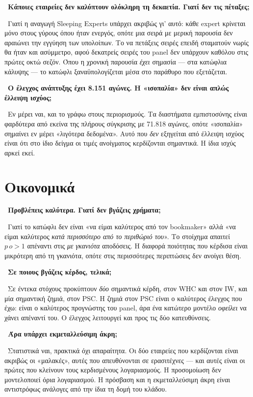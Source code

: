 \documentclass[11pt,a4paper]{article}
\newcommand{\qa}[2]{%
  \par\medskip\noindent{\color{qcol}\textbf{Ε.}}\ \textbf{#1}\par
  \noindent{\color{qcol}\textbf{Α.}}\ #2\par}
\begin{document}
\qa{Κάποιες εταιρείες δεν καλύπτουν ολόκληρη τη δεκαετία. Γιατί δεν τις πέταξες;}
{Γιατί η αναγωγή Sleeping Experts υπάρχει ακριβώς γι' αυτό: κάθε expert κρίνεται μόνο στους
γύρους όπου ήταν ενεργός, οπότε μια σειρά με μερική παρουσία δεν αραιώνει την εγγύηση των
υπολοίπων. Το να πετάξεις σειρές επειδή σταματούν νωρίς θα ήταν και ασύμμετρο, αφού
δεκατρείς σειρές του panel δεν υπάρχουν καθόλου στις πρώτες οκτώ σεζόν. Όπου η χρονική
παρουσία \emph{έχει} σημασία --- στα κατώφλια κάλυψης --- το κατώφλι ξαναϋπολογίζεται μέσα
στο παράθυρο που εξετάζεται.}

\qa{Ο έλεγχος ανάπτυξης έχει 8.151 αγώνες. Η «ισοπαλία» δεν είναι απλώς έλλειψη ισχύος;}
{Εν μέρει ναι, και το γράφω στους περιορισμούς. Τα διαστήματα εμπιστοσύνης είναι φαρδύτερα
από εκείνα της πλήρους σύγκρισης με 71.818 αγώνες, οπότε «ισοπαλία» σημαίνει εν μέρει
«λιγότερα δεδομένα». Αυτό που \emph{δεν} εξηγείται από έλλειψη ισχύος είναι ότι στο ίδιο
δείγμα οι τιμές ανοίγματος κερδίζονται σημαντικά. Η ίδια ισχύς αρκεί εκεί.}

\section{Οικονομικά}

\qa{Προβλέπεις καλύτερα. Γιατί δεν βγάζεις χρήματα;}
{Γιατί το κατώφλι δεν είναι «να είμαι καλύτερος από τον bookmaker» αλλά «να είμαι καλύτερος
\emph{κατά περισσότερο από το περιθώριό του}». Το στοίχημα απαιτεί $p\,o>1$ απέναντι στις
\emph{με γκανιότα} αποδόσεις. Η διαφορά ποιότητας που κέρδισα είναι μικρότερη από τη
γκανιότα, οπότε στις περισσότερες περιπτώσεις δεν ανοίγει θέση.}

\qa{Σε ποιους βγάζεις κέρδος, τελικά;}
{Σε έντεκα στόχους προκύπτουν \emph{δύο} σημαντικά κέρδη, στον WHC και στον IW, και μία
σημαντική ζημιά, στον PSC. Η ζημιά στον PSC είναι ο καλύτερος έλεγχος που έχω: είναι ο
καλύτερος προγνώστης του panel, άρα ένα κατώτερο μοντέλο \emph{οφείλει} να χάνει απέναντί
του. Ο έλεγχος λειτουργεί και προς τις δύο κατευθύνσεις.}

\qa{Άρα υπάρχει εκμεταλλεύσιμη άκρη;}
{Στατιστικά ναι, πρακτικά όχι απαραίτητα. Οι δύο εταιρείες που κερδίζονται είναι ακριβώς οι
«μαλακές», αυτές που απευθύνονται σε ερασιτέχνες --- και αυτές είναι οι πρώτες που κλείνουν
τους κερδισμένους λογαριασμούς. Η προσομοίωση δεν μοντελοποιεί όρια λογαριασμού. Η πρόσβαση
και η εκμεταλλεύσιμη άκρη είναι αντιστρόφως ανάλογες από την ίδια τη δομή του κλάδου.}
\end{document}
